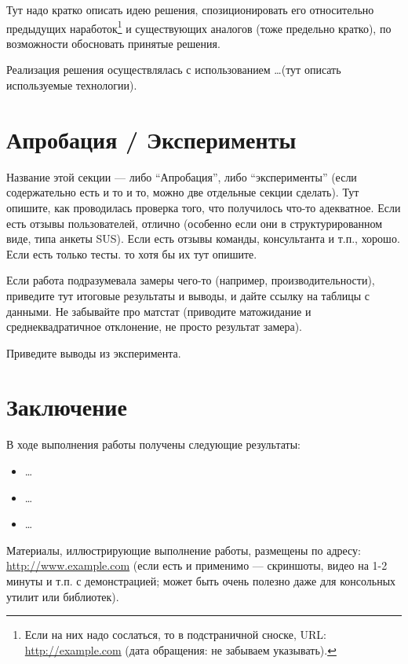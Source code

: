 \documentclass[a4paper]{article}
\begin{document}
Тут надо кратко описать идею решения, спозиционировать его относительно предыдущих наработок\footnote{Если на них надо сослаться, то в подстраничной сноске, URL: \url{http://example.com} (дата обращения: не забываем указывать).} и существующих аналогов (тоже предельно кратко), по возможности обосновать принятые решения.

Реализация решения осуществлялась с использованием \dots (тут описать используемые технологии).

\section{Апробация / Эксперименты}


Название этой секции --- либо \enquote{Апробация}, либо \enquote{эксперименты} (если содержательно есть и то и то, можно две отдельные секции сделать). Тут опишите, как проводилась проверка того, что получилось что-то адекватное. Если есть отзывы пользователей, отлично (особенно если они в структурированном виде, типа анкеты SUS). Если есть отзывы команды, консультанта и т.п., хорошо. Если есть только тесты. то хотя бы их тут опишите.

Если работа подразумевала замеры чего-то (например, производительности), приведите тут итоговые результаты и выводы, и дайте ссылку на таблицы с данными. Не забывайте про матстат (приводите матожидание и среднеквадратичное отклонение, не просто результат замера).

Приведите выводы из эксперимента.

\section{Заключение}

В ходе выполнения работы получены следующие результаты:


\begin{itemize}
    \item \dots
    \item \dots
    \item \dots
\end{itemize}

Материалы, иллюстрирующие выполнение работы, размещены по адресу: \url{http://www.example.com} (если есть и применимо --- скриншоты, видео на 1-2 минуты и т.п. с демонстрацией; может быть очень полезно даже для консольных утилит или библиотек).
\end{document}
